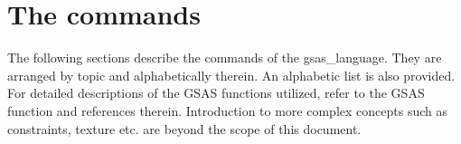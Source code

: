 \newcommand{\glcommand}[6]{

\subsection{#1}
\leftskip2em #2\\
\\
\leftskip2em \textbf{Syntax:}\\
\\
\leftskip2em \texttt{#3}\\
\\
\leftskip2em \textbf{Parameters:}
\begin{itemize}
\leftskip2em #4
\end{itemize}
\leftskip2em \textbf{Example:}\\
\\
\leftskip2em \texttt{#5}\\
\\
\leftskip2em #6\\
}



\chapter{The commands}
The following sections describe the commands of the gsas\_language. They are arranged by topic and alphabetically therein. An alphabetic list is also provided. For detailed descriptions of the GSAS functions utilized, refer to the GSAS function and references therein. Introduction to more complex concepts such as constraints, texture etc. are beyond the scope of this document.

